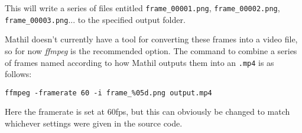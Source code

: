 This will write a series of files entitled \verb|frame_00001.png|, \verb|frame_00002.png|, \verb|frame_00003.png|... to the specified output folder.

Mathil doesn't currently have a tool for converting these frames into a video file, so for now \emph{ffmpeg} is the recommended option. The command to combine a series of frames named according to how Mathil outputs them into an \verb|.mp4| is as follows:

\begin{lstlisting}
ffmpeg -framerate 60 -i frame_%05d.png output.mp4
\end{lstlisting}

Here the framerate is set at 60fps, but this can obviously be changed to match whichever settings were given in the source code.